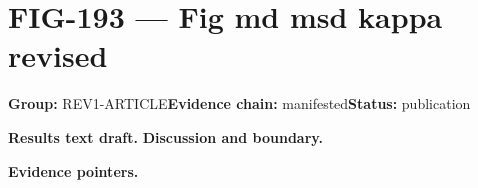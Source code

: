 \clearpage
\section{FIG-193 --- Fig md msd kappa revised}
\label{figpage:fig-193}
\textbf{Group:} REV1-ARTICLE\quad \textbf{Evidence chain:} manifested\quad \textbf{Status:} publication

\textbf{Results text draft.} 
\textbf{Discussion and boundary.} 


\textbf{Evidence pointers.}



\vfill
